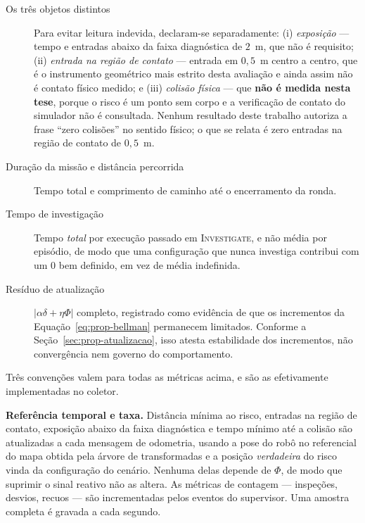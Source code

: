 \begin{description}
    \item[Os três objetos distintos] Para evitar leitura indevida, declaram-se
    separadamente: (i) \emph{exposição} --- tempo e entradas abaixo da faixa
    diagnóstica de $2$~m, que não é requisito; (ii) \emph{entrada na região de contato}
    --- entrada em $0{,}5$~m centro a centro, que é o instrumento geométrico mais
    estrito desta avaliação e ainda assim não é contato físico medido; e (iii)
    \emph{colisão física} --- que \textbf{não é medida nesta tese}, porque o risco é um
    ponto sem corpo e a verificação de contato do simulador não é consultada. Nenhum
    resultado deste trabalho autoriza a frase ``zero colisões'' no sentido físico; o que
    se relata é zero entradas na região de contato de $0{,}5$~m.

    \item[Duração da missão e distância percorrida] Tempo total e comprimento de
    caminho até o encerramento da ronda.

    \item[Tempo de investigação] Tempo \emph{total} por execução passado em
    \textsc{Investigate}, e não média por episódio, de modo que uma configuração
    que nunca investiga contribui com um $0$ bem definido, em vez de média
    indefinida.

    \item[Resíduo de atualização] $|\alpha\delta+\eta\Phi|$ completo, registrado como
    evidência de que os incrementos da Equação~\eqref{eq:prop-bellman} permanecem
    limitados. Conforme a Seção~\ref{sec:prop-atualizacao}, isso atesta estabilidade
    dos incrementos, não convergência nem governo do comportamento.
\end{description}

Três convenções valem para todas as métricas acima, e são as efetivamente
implementadas no coletor.

\textbf{Referência temporal e taxa.} Distância mínima ao risco, entradas na região de
contato, exposição abaixo da faixa diagnóstica e tempo mínimo até a colisão são
atualizadas a cada mensagem de odometria, usando a pose do robô no referencial do mapa
obtida pela árvore de transformadas e a posição \emph{verdadeira} do risco vinda da
configuração do cenário. Nenhuma delas depende de $\Phi$, de modo que suprimir o sinal
reativo não as altera. As métricas de contagem --- inspeções, desvios, recuos --- são
incrementadas pelos eventos do supervisor. Uma amostra completa é gravada a cada
segundo.

